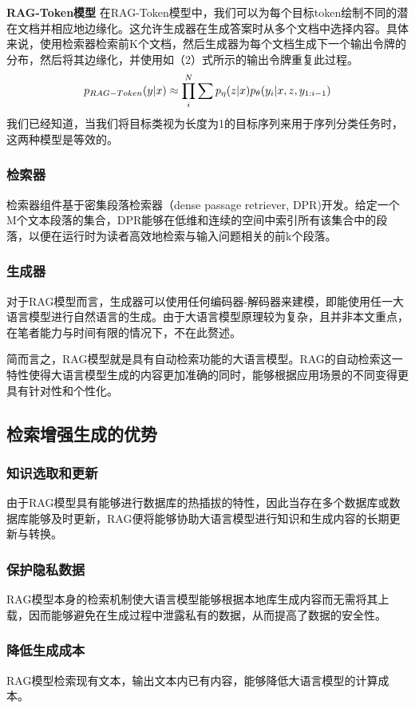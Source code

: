 \documentclass[zihao=-4]{ctexart}
\begin{document}
\begin{spacing}{1.5}
\textbf{RAG-Token模型 }  在RAG-Token模型中，我们可以为每个目标token绘制不同的潜在文档并相应地边缘化。这允许生成器在生成答案时从多个文档中选择内容。具体来说，使用检索器检索前K个文档，然后生成器为每个文档生成下一个输出令牌的分布，然后将其边缘化，并使用如（2）式所示的输出令牌重复此过程。
\begin{align}
{\Huge p_{RAG-Token}(y|x)\approx \prod_{i}^{N} \sum p_{\eta}(z|x)p_{\theta }(y_{i}|x,z,y_{1:i-1})}
\end{align}
\label{eq2}
我们已经知道，当我们将目标类视为长度为1的目标序列来用于序列分类任务时，这两种模型是等效的\cite{3}。
\subsubsection{检索器}
  检索器组件基于密集段落检索器\cite{4}（dense passage retriever, DPR)开发。给定一个M个文本段落的集合，DPR能够在低维和连续的空间中索引所有该集合中的段落，以便在运行时为读者高效地检索与输入问题相关的前k个段落\cite{4}。
\subsubsection{生成器}
  对于RAG模型而言，生成器可以使用任何编码器-解码器来建模\cite{3}，即能使用任一大语言模型进行自然语言的生成。由于大语言模型原理较为复杂，且并非本文重点，在笔者能力与时间有限的情况下，不在此赘述。

  简而言之，RAG模型就是具有自动检索功能的大语言模型。RAG的自动检索这一特性使得大语言模型生成的内容更加准确的同时，能够根据应用场景的不同变得更具有针对性和个性化。
\subsection{检索增强生成的优势}
 \subsubsection{知识选取和更新 }  由于RAG模型具有能够进行数据库的热插拔的特性，因此当存在多个数据库或数据库能够及时更新，RAG便将能够协助大语言模型进行知识和生成内容的长期更新与转换。

 \subsubsection{保护隐私数据 }  RAG模型本身的检索机制使大语言模型能够根据本地库生成内容而无需将其上载，因而能够避免在生成过程中泄露私有的数据，从而提高了数据的安全性。

 \subsubsection{降低生成成本 }  RAG模型检索现有文本，输出文本内已有内容，能够降低大语言模型的计算成本。


\end{spacing}
\end{document}
